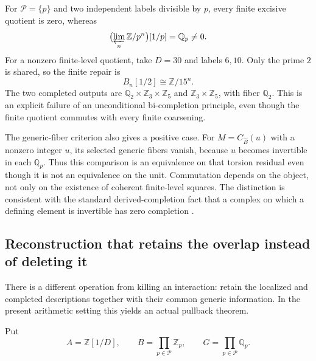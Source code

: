 \begin{example}\label{ex:repair-before-completion}
For $\mathcal P=\{p\}$ and two independent labels divisible by $p$, every finite excisive quotient is zero, whereas
\[
 \bigl(\varprojlim_n\mathbb Z/p^n\bigr)[1/p]=\mathbb Q_p\ne0.
\]
For a nonzero finite-level quotient, take $D=30$ and labels $6,10$. Only the prime $2$ is shared, so the finite repair is
\[
 B_n[1/2]\cong\mathbb Z/15^n.
\]
The two completed outputs are $\mathbb Q_2\times\mathbb Z_3\times\mathbb Z_5$ and $\mathbb Z_3\times\mathbb Z_5$, with fiber $\mathbb Q_2$. This is an explicit failure of an unconditional bi-completion principle, even though the finite quotient commutes with every finite coarsening.
\end{example}

The generic-fiber criterion also gives a positive case. For $M=C_{\widehat B}(u)$ with a nonzero integer $u$, its selected generic fibers vanish, because $u$ becomes invertible in each $\mathbb Q_p$. Thus this comparison is an equivalence on that torsion residual even though it is not an equivalence on the unit. Commutation depends on the object, not only on the existence of coherent finite-level squares. The distinction is consistent with the standard derived-completion fact that a complex on which a defining element is invertible has zero completion \cite{StacksDerivedCompletion}.

\subsection{Reconstruction that retains the overlap instead of deleting it}

There is a different operation from killing an interaction: retain the localized and completed descriptions together with their common generic information. In the present arithmetic setting this yields an actual pullback theorem.

Put
\[
 A=\mathbb Z[1/D],\qquad B=\prod_{p\in\mathcal P}\mathbb Z_p,
 \qquad G=\prod_{p\in\mathcal P}\mathbb Q_p.
\]

